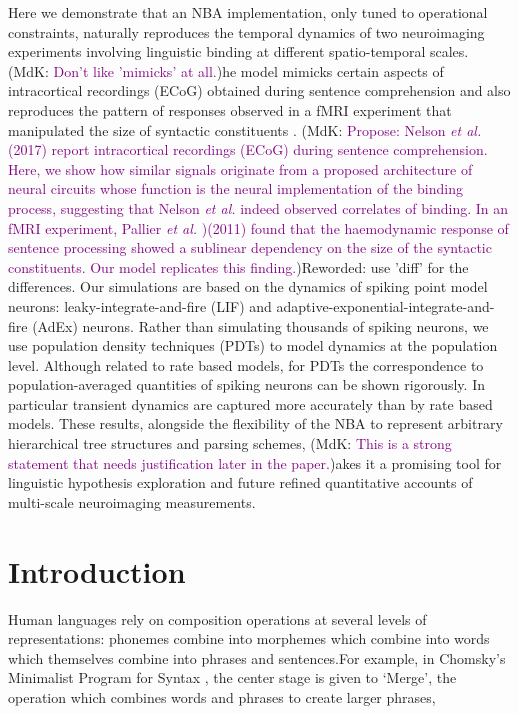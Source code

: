 \documentclass[10pt]{article}
\newcommand{\notenewMdK}[2]{(MdK: \textcolor{purple}{#1})}
\begin{document}
Here we demonstrate that an NBA implementation, only tuned to operational constraints, naturally reproduces the temporal dynamics of two neuroimaging experiments involving 
linguistic binding at different spatio-temporal scales. 
\notenewMdK{Don't like 'mimicks' at all.}
The model mimicks certain aspects of intracortical recordings (ECoG) obtained during sentence comprehension \cite{Nelson_2017} and also reproduces the pattern of responses observed in a fMRI experiment that manipulated the size of syntactic constituents \cite{Pallier_2011}.
\notenewMdK{Propose: Nelson \emph{et al.} (2017) report intracortical recordings (ECoG) during sentence comprehension. Here, we show how similar signals originate from
a proposed architecture of neural circuits whose function is the neural implementation of the binding process, suggesting that Nelson \emph{et al.} indeed observed 
correlates of binding. In an fMRI experiment, Pallier \emph{et al.} )(2011)  found that the haemodynamic response of sentence processing showed a sublinear dependency
on the size of the syntactic constituents. Our model replicates this finding.}


\notenewMdK{Reworded: use 'diff' for the differences.}
Our simulations are based on the dynamics of spiking point model neurons: leaky-integrate-and-fire (LIF) and adaptive-exponential-integrate-and-fire (AdEx) neurons.
Rather than simulating thousands of spiking neurons, we use population density techniques (PDTs) to model dynamics at the population level. Although related to rate based models, 
for PDTs the correspondence to population-averaged quantities of spiking neurons can be shown rigorously.
In particular transient dynamics are captured more accurately than by rate based models.
These results, alongside the flexibility of the NBA to represent arbitrary hierarchical tree structures and parsing schemes, \notenewMdK{This is a strong statement that needs justification later in the paper.}
makes it a promising tool for linguistic hypothesis exploration and future refined quantitative accounts of multi-scale neuroimaging measurements.


\section{Introduction}

{\label{931947}}

Human languages rely on composition operations at several levels of representations: phonemes combine into morphemes which combine into words which themselves combine into 
phrases and sentences.For example, in Chomsky's Minimalist Program for Syntax \cite{Chomsky_2013}, the center stage is given to `Merge', the operation which combines words and phrases to create larger phrases, 
\end{document}
